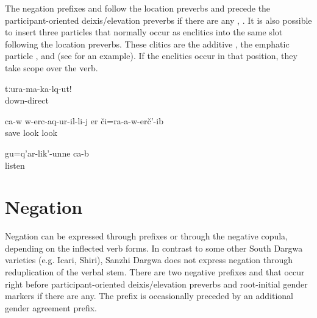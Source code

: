 The negation prefixes  and  follow the location preverbs and precede the participant-oriented deixis/elevation preverbs if there are any , . It is also possible to insert three particles that normally occur as enclitics into the same slot following the location preverbs. These clitics are the additive  , the emphatic particle  , and  (see  for an example). If the enclitics occur in that position, they take scope over the verb.
%
\begin{exe}
	\ex	\label{ex:Do not go out (of the car) (said to a man) verbs}
	\gll	tːura-ma-ka-lq-ut!\\
		down-direct\\
	\glt	{}

	\ex	\label{ex:He did not even look at his savior verbs}
	\gll	ca-w	w-erc-aq-ur-il-li-j	er či=ra-a-w-erč'-ib\\
			save	look look\\
	\glt	{}

	\ex	\label{ex:As for listening, s/he is listening verbs}
	\gll	gu=q'ar-lik'-unne	ca-b\\
		listen	\\
	\glt	{}
\end{exe}



\section{Negation}
\label{sec:Negation}

Negation can be expressed through prefixes or through the negative copula, depending on the inflected verb forms. In contrast to some other South Dargwa varieties (e.g. Icari, Shiri), Sanzhi Dargwa does not express negation through reduplication of the verbal stem. There are two negative prefixes  and  that occur right before participant-oriented deixis/elevation preverbs and root-initial gender markers if there are any. The prefix  is occasionally preceded by an additional gender agreement prefix.

